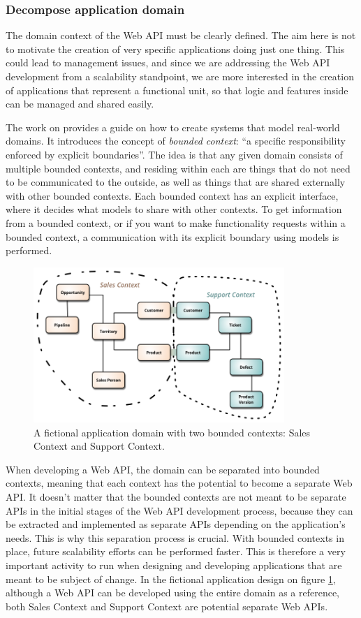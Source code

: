 \documentclass[10pt,article]{IEEEtran}
\begin{document}
\subsubsection{Decompose application domain}
The domain context of the Web API must be clearly defined. The aim here is not to motivate the creation of very specific applications doing just one thing. This could lead to management issues, and since we are addressing the Web API development from a scalability standpoint, we are more interested in the creation of applications that represent a functional unit, so that logic and features inside can be managed and shared easily.

The work on \cite{evans:ddd} provides a guide on how to create systems that model real-world domains. It introduces the concept of \textit{bounded context}: ``a specific responsibility enforced by explicit boundaries''. The idea is that any given domain consists of multiple bounded contexts, and residing within each are things that do not need to be communicated to the outside, as well as things that are shared externally with other bounded contexts. Each bounded context has an explicit interface, where it decides what models to share with other contexts.
To get information from a bounded context, or if you want to make functionality requests within a bounded context, a communication with its explicit boundary using models is performed.

\begin{figure}[h]
    \hspace{-0.5cm}
    \includegraphics[width=9.5cm]{bounded-context}
    \caption{A fictional application domain with two bounded contexts: Sales Context and Support Context.\cite{fowler:bounded-context}}
    \label{fig:bounded-context}
\end{figure}


When developing a Web API, the domain can be separated into bounded contexts, meaning that each context has the potential to become a separate Web API. It doesn’t matter that the bounded contexts are not meant to be separate APIs in the initial stages of the Web API development process, because they can be extracted and implemented as separate APIs depending on the application’s needs.  This is why this separation process is crucial. With bounded contexts in place, future scalability efforts can be performed faster. This is therefore a very important activity to run when designing and developing applications that are meant to be subject of change. In the fictional application design on figure \ref{fig:bounded-context}, although a Web API can be developed using the entire domain as a reference, both Sales Context and Support Context are potential separate Web APIs. 
\end{document}
